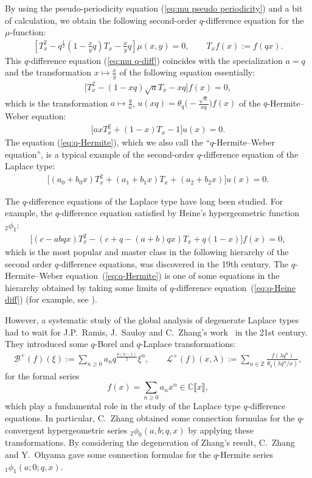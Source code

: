 \documentclass[pdftex]{sigma}
\numberwithin{equation}{section}
\theoremstyle{definition}
\newcommand{\Zz}{\mathbb{Z}}
\newcommand{\Cz}{\mathbb{C}}
\begin{document}
By using the pseudo-periodicity equation (\ref{eq:mu pseudo periodicity}) and a bit of calculation, we obtain the following second-order $q$-difference equation for the $\mu$-function:
\begin{gather}
\label{eq:mu q-diff}
\left[T_{x}^2-q^{\frac{1}{2}}\left(1-\frac{x}{y}q\right)T_{x}-\frac{x}{y}q\right]\mu(x,y)=0, \qquad T_{x}f(x):=f(qx).
\end{gather}
This $q$-difference equation (\ref{eq:mu q-diff}) coincides with the specialization $a=q$ and the transformation $x\mapsto \frac{x}{y}$ of the following equation essentially:
\begin{gather}
\label{eq:q-Hermite}
\big[T_x^2-(1-xq)\sqrt{a}T_x-xq\big]f(x)=0,
\end{gather}
which is the transformation $a\mapsto \frac{q}{a}$, $u(xq)=\theta_q\big({-}\frac{\sqrt{a}}{xq}\big)f(x)$ of the $q$-Hermite--Weber equation:
\begin{gather*}
\big[axT_{x}^{2}+(1-x)T_{x}-1\big]u(x)=0.
\end{gather*}
The equation (\ref{eq:q-Hermite}), which we also call the ``$q$-Hermite--Weber equation'', is a typical example of the second-order $q$-difference equation of the Laplace type:
\begin{gather*} %
\big[(a_{0}+b_{0}x)T_{x}^{2}+(a_{1}+b_{1}x)T_{x}+(a_{2}+b_{2}x)\big]u(x)=0.
\end{gather*}

The $q$-difference equations of the Laplace type have long been studied.
For example, the $q$-difference equation satisfied by Heine's hypergeometric function ${}_2\phi_1$:
\begin{gather}
\label{eq:q-Heine diff}
\big[(c-abqx)T_{x}^{2}-(c+q-(a+b)qx)T_x+q(1-x)\big]f(x)=0,
\end{gather}
which is the most popular and master class in the following hierarchy of the second order $q$-difference equations, was discovered in the 19th century.
The $q$-Hermite--Weber equation~(\ref{eq:q-Hermite}) is one of some equations in the hierarchy obtained by taking some limits of $q$-difference equation~(\ref{eq:q-Heine diff}) (for example, see \cite[Figure~2]{O1}).

However, a systematic study of the global analysis of degenerate Laplace types had to wait for J.P.~Ramis, J.~Sauloy and C.~Zhang's work~\cite{RSZ} in the 21st century.
They introduced some $q$-Borel and $q$-Laplace transformations:
\begin{gather}
\mathcal{B}^{+}(f)(\xi):=\sum_{n\geq 0}a_{n}q^{\frac{n(n-1)}{2}}\xi^{n}, \qquad
\label{eq:q-Laplace}
 \mathcal{L}^{+}(f)(x,\lambda):=\sum_{n\in\Zz}\frac{f(\lambda q^n)}{\theta_q(\lambda q^{n}/x)},
\end{gather}
for the formal series
\[
f(x)=\sum_{n\geq 0}a_{n}x^{n} \in \Cz\llbracket x \rrbracket,
\]
which play a fundamental role in the study of the Laplace type $q$-difference equations.
In particular, C.~Zhang \cite{Zh} obtained some connection formulas for the $q$-convergent hypergeometric series ${}_2\phi_0(a,b;q,x)$ by applying these transformations.
By considering the degeneration of Zhang's result, C.~Zhang and Y.~Ohyama \cite{O2} gave some connection formulas for the $q$-Hermite series ${}_1\phi_1(a;0;q,x)$.
\end{document}
